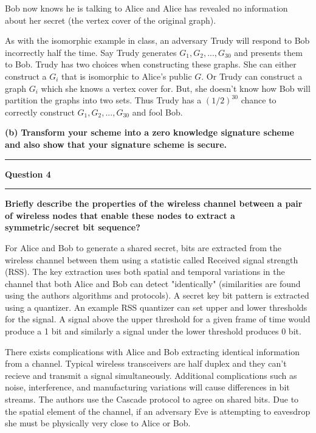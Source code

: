 \documentclass[11pt]{article}
\newcommand\question[2]{\vspace{.25in}\hrule\textbf{#1}\vspace{.5em}\hrule\vspace{.10in}}
\renewcommand\part[1]{\vspace{.10in}\textbf{(#1)}}
\begin{document}
Bob now knows he is talking to Alice and Alice has revealed no information about her secret (the vertex cover of the original graph).

As with the isomorphic example in class, an adversary Trudy will respond to Bob incorrectly half the time. Say Trudy generates $G_1, G_2, ..., G_{30}$ and presents them to Bob. Trudy has two choices when constructing these graphs. She can either construct a $G_i$ that is isomorphic to Alice's public $G$. Or Trudy can construct a graph $G_i$ which she knows a vertex cover for. But, she doesn't know how Bob will partition the graphs into two sets. Thus Trudy has a $(1/2)^{30}$ chance to correctly construct $G_1, G_2, ..., G_{30}$ and fool Bob.

\part{b} \textbf{Transform your scheme into a zero knowledge signature scheme and also show that your signature scheme is secure.}

\question{Question 4}

\part{a} \textbf{Briefly describe the properties of the wireless channel between a pair of wireless nodes that enable these nodes to extract a symmetric/secret bit sequence?}

For Alice and Bob to generate a shared secret, bits are extracted from the wireless channel between them using a statistic called Received signal strength (RSS). The key extraction uses both spatial and temporal variations in the channel that both Alice and Bob can detect "identically" (similarities are found using the authors algorithms and protocols). A secret key bit pattern is extracted using a quantizer. An example RSS quantizer can set upper and lower thresholds for the signal. A signal above the upper threshold for a given frame of time would produce a 1 bit and similarly a signal under the lower threshold produces 0 bit. 

There exists complications with Alice and Bob extracting identical information from a channel. Typical wireless transceivers are half duplex and they can't recieve and transmit a signal simultaneously. Additional complications such as noise, interference, and manufacturing variations will cause differences in bit streams. The authors use the Cascade protocol to agree on shared bits. Due to the spatial element of the channel, if an adversary Eve is attempting to eavesdrop she must be physically very close to Alice or Bob.
\end{document}
